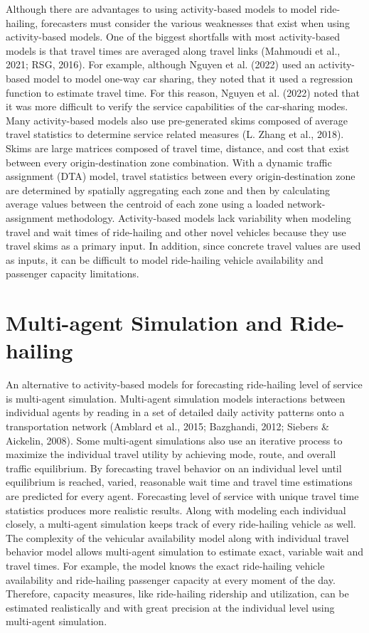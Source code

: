 \documentclass[fancy, masters]{byuthesis}
\begin{document}
Although there are advantages to using activity-based models to model ride-hailing, forecasters must consider the various weaknesses that exist when using activity-based models. One of the biggest shortfalls with most activity-based models is that travel times are averaged along travel links (Mahmoudi et al., 2021; RSG, 2016). For example, although Nguyen et al. (2022) used an activity-based model to model one-way car sharing, they noted that it used a regression function to estimate travel time. For this reason, Nguyen et al. (2022) noted that it was more difficult to verify the service capabilities of the car-sharing modes. Many activity-based models also use pre-generated skims composed of average travel statistics to determine service related measures (L. Zhang et al., 2018). Skims are large matrices composed of travel time, distance, and cost that exist between every origin-destination zone combination. With a dynamic traffic assignment (DTA) model, travel statistics between every origin-destination zone are determined by spatially aggregating each zone and then by calculating average values between the centroid of each zone using a loaded network-assignment methodology. Activity-based models lack variability when modeling travel and wait times of ride-hailing and other novel vehicles because they use travel skims as a primary input. In addition, since concrete travel values are used as inputs, it can be difficult to model ride-hailing vehicle availability and passenger capacity limitations.

\hypertarget{lit-mas}{%
\section{Multi-agent Simulation and Ride-hailing}\label{lit-mas}}

An alternative to activity-based models for forecasting ride-hailing level of service is multi-agent simulation. Multi-agent simulation models interactions between individual agents by reading in a set of detailed daily activity patterns onto a transportation network (Amblard et al., 2015; Bazghandi, 2012; Siebers \& Aickelin, 2008). Some multi-agent simulations also use an iterative process to maximize the individual travel utility by achieving mode, route, and overall traffic equilibrium. By forecasting travel behavior on an individual level until equilibrium is reached, varied, reasonable wait time and travel time estimations are predicted for every agent. Forecasting level of service with unique travel time statistics produces more realistic results. Along with modeling each individual closely, a multi-agent simulation keeps track of every ride-hailing vehicle as well. The complexity of the vehicular availability model along with individual travel behavior model allows multi-agent simulation to estimate exact, variable wait and travel times. For example, the model knows the exact ride-hailing vehicle availability and ride-hailing passenger capacity at every moment of the day. Therefore, capacity measures, like ride-hailing ridership and utilization, can be estimated realistically and with great precision at the individual level using multi-agent simulation.
\end{document}
